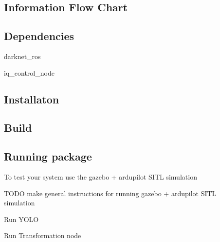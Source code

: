 \subsection*{Information Flow Chart}



\subsection*{Dependencies}


\begin{DoxyItemize}
\item darknet\+\_\+ros
\item iq\+\_\+control\+\_\+node
\end{DoxyItemize}


\begin{DoxyCode}{0}
\end{DoxyCode}
 \subsection*{Installaton}


\begin{DoxyCode}{0}
\end{DoxyCode}


\subsection*{Build}


\begin{DoxyCode}{0}
\end{DoxyCode}


\subsection*{Running package}

To test your system use the gazebo + ardupilot S\+I\+TL simulation

T\+O\+DO make general instructions for running gazebo + ardupilot S\+I\+TL simulation

Run Y\+O\+LO 
\begin{DoxyCode}{0}
\end{DoxyCode}


Run Transformation node 
\begin{DoxyCode}{0}
\end{DoxyCode}
 